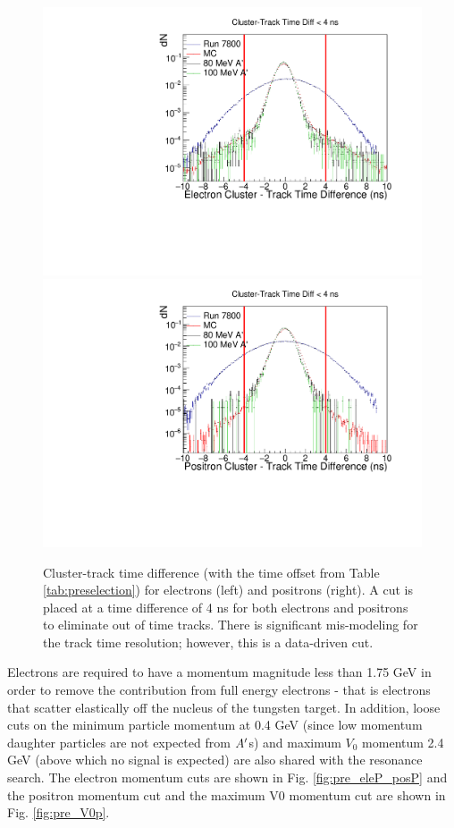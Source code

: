 \begin{figure}[t]
    \centering
    \includegraphics[width=.45\textwidth]{figs/recon/pre_eleTrkT.pdf}
    \includegraphics[width=.45\textwidth]{figs/recon/pre_posTrkT.pdf}
    \caption{Cluster-track time difference (with the time offset from Table \ref{tab:preselection}) for electrons (left) and positrons (right). A cut is placed at a time difference of 4 ns for both electrons and positrons to eliminate out of time tracks. There is significant mis-modeling for the track time resolution; however, this is a data-driven cut.}
    \label{fig:pre_trkT}
\end{figure}

Electrons are required to have a momentum magnitude less than 1.75 GeV in order to remove the contribution from full energy electrons - that is electrons that scatter elastically off the nucleus of the tungsten target. In addition, loose cuts on the minimum particle momentum at 0.4 GeV (since low momentum daughter particles are not expected from $A^\prime$s) and maximum $V_0$ momentum 2.4 GeV (above which no signal is expected) are also shared with the resonance search. The electron momentum cuts are shown in Fig. \ref{fig:pre_eleP_posP} and the positron momentum cut and the maximum V0 momentum cut are shown in Fig. \ref{fig:pre_V0p}.

